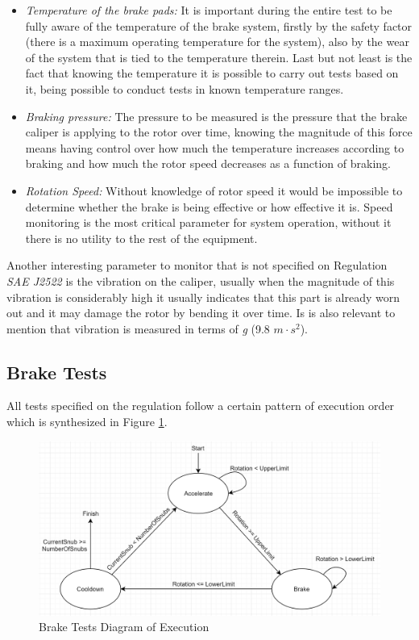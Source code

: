 			\begin{itemize}
				\item \textit{Temperature of the brake pads:} It is important during the entire test to be fully aware of the temperature of the brake system, firstly by the safety factor (there is a maximum operating temperature for the system), also by the wear of the system that is tied to the temperature therein. Last but not least is the fact that knowing the temperature it is possible to carry out tests based on it, being possible to conduct tests in known temperature ranges.\label{itm:monitored-temperature}
				\item \textit{Braking pressure:} The pressure to be measured is the pressure that the brake caliper is applying to the rotor over time, knowing the magnitude of this force means having control over how much the temperature increases according to braking and how much the rotor speed decreases as a function of braking.\label{itm:monitored-pressure}
				\item \textit{Rotation Speed:} Without knowledge of rotor speed it would be impossible to determine whether the brake is being effective or how effective it is. Speed monitoring is the most critical parameter for system operation, without it there is no utility to the rest of the equipment. \label{itm:monitored-speed}
			\end{itemize}

			Another interesting parameter to monitor that is not specified on Regulation \textit{SAE J2522} is the vibration on the caliper, usually when the magnitude of this vibration is considerably high it usually indicates that this part is already worn out \cite{goodyear-calipers} and it may damage the rotor by bending it over time. Is is also relevant to mention that vibration is measured in terms of \textit{g} (9.8 $m\cdot s^2$).

		\subsection{Brake Tests}\label{ssec:brake-tests}
			All tests specified on the regulation follow a certain pattern of execution order which is synthesized in Figure \ref{fig:brake-test-diagram}.

			\begin{figure}[htbp]
				\centering
				\includegraphics[width=.8\textwidth]{figuras/fig-brake-test-diagram}
				\caption{Brake Tests Diagram of Execution}
				\label{fig:brake-test-diagram}
			\end{figure}

